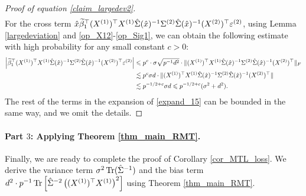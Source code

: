 \begin{proof}[Proof of equation \eqref{claim_largedev2}]
\begin{align*}
\end{align*} 
For the cross term $\hat x \widetilde \beta_1^\top (X^{(1)})^\top X^{(1)} \hat \Sigma(\hat x)^{-1}  \Sigma^{(2)} \hat \Sigma(\hat x)^{-1}  (X^{(2)})^\top  \varepsilon^{(2)}$, using Lemma \ref{largedeviation} and \eqref{op_X12}-\eqref{op_Sig1}, we can obtain the following estimate with high probability for any small constant $c>0$:
\begin{align*}
 \left|\widetilde \beta_1^\top (X^{(1)})^\top X^{(1)} \hat \Sigma(\hat x)^{-1}  \Sigma^{(2)} \hat \Sigma(\hat x)^{-1}  (X^{(2)})^\top  \varepsilon^{(2)}\right|  & \leqslant p^c \cdot \sigma\sqrt{p^{-1}d^2} \cdot \|(X^{(1)})^\top X^{(1)} \hat \Sigma(\hat x)^{-1}  \Sigma^{(2)} \hat \Sigma(\hat x)^{-1}  (X^{(2)})^\top  \|_F \\
&\lesssim p^{c}\sigma d \cdot  \|(X^{(1)})^\top X^{(1)} \hat \Sigma(\hat x)^{-1}  \Sigma^{(2)} \hat \Sigma(\hat x)^{-1}  (X^{(2)})^\top  \| \\
&\lesssim p^{-1/2+c}\sigma d\leqslant p^{-1/2+c}(\sigma^2+ d^2).
\end{align*}
The rest of the terms in the expansion of \eqref{expand_15} can be bounded in the same way, and we omit the details.
 \end{proof}
  
\paragraph{Part $3$: Applying Theorem \ref{thm_main_RMT}.}
Finally, we are ready to complete the proof of Corollary \ref{cor_MTL_loss}.
We derive the variance term $\sigma^2  \operatorname{Tr}(\hat\Sigma^{-1})$ and the bias term $d^2\cdot {p}^{-1}\operatorname{Tr}\left[\hat\Sigma^{-2} \left((X^{(1)})^\top X^{(1)} \right)^2\right]$ using Theorem \ref{thm_main_RMT}.

